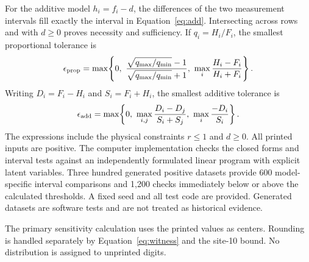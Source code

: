 \documentclass[11pt,a4paper]{article}
\begin{document}
For the additive model $h_i=f_i-d$, the differences of the two measurement intervals fill exactly the interval in Equation~\ref{eq:add}. Intersecting across rows and with $d\geq0$ proves necessity and sufficiency. If $q_i=H_i/F_i$, the smallest proportional tolerance is
\[
\epsilon_{\rm prop}=\max\!\left\{0,\ \frac{\sqrt{q_{\max}/q_{\min}}-1}{\sqrt{q_{\max}/q_{\min}}+1},\ \max_i\frac{H_i-F_i}{H_i+F_i}\right\}.
\]
Writing $D_i=F_i-H_i$ and $S_i=F_i+H_i$, the smallest additive tolerance is
\[
\epsilon_{\rm add}=\max\!\left\{0,\ \max_{i,j}\frac{D_i-D_j}{S_i+S_j},\ \max_i\frac{-D_i}{S_i}\right\}.
\]
The expressions include the physical constraints $r\leq1$ and $d\geq0$. All printed inputs are positive. The computer implementation checks the closed forms and interval tests against an independently formulated linear program with explicit latent variables. Three hundred generated positive datasets provide 600 model-specific interval comparisons and 1,200 checks immediately below or above the calculated thresholds. A fixed seed and all test code are provided. Generated datasets are software tests and are not treated as historical evidence.

The primary sensitivity calculation uses the printed values as centers. Rounding is handled separately by Equation~\ref{eq:witness} and the site-10 bound. No distribution is assigned to unprinted digits.
\end{document}
